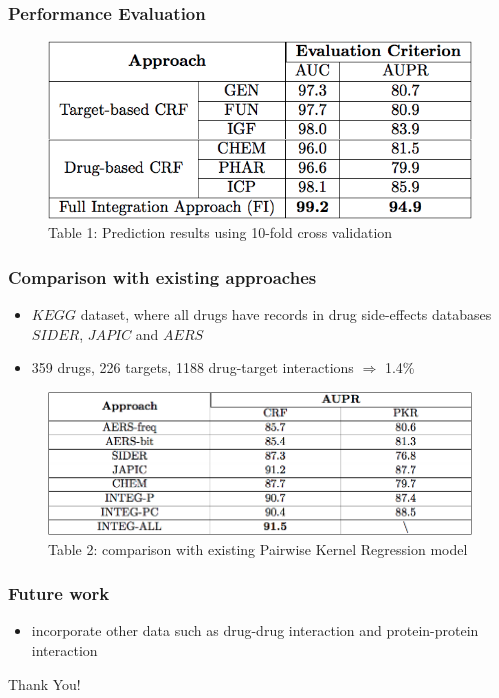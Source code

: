 \documentclass[11pt]{beamer}
\begin{document}
\begin{frame}
\frametitle{Performance Evaluation}
\begin{center}
\begin{figure}
\includegraphics[scale=0.4]{table1} 
\caption{Table 1: Prediction results using 10-fold cross validation}
\end{figure}
\end{center}
\end{frame}

\begin{frame}
\frametitle{Comparison with existing approaches}
\begin{itemize}
\item $KEGG$ dataset, where all drugs have records in drug side-effects databases $SIDER$, $JAPIC$ and $AERS$
\item 359 drugs, 226 targets, 1188 drug-target interactions $\Rightarrow$ 1.4\%
\end{itemize}

\begin{center}
\begin{figure}
\includegraphics[scale=0.3]{table2} 
\caption{Table 2: comparison with existing Pairwise Kernel Regression model}
\end{figure}
\end{center}
\end{frame}

\begin{frame}
\frametitle{Future work}
\begin{itemize}
\item incorporate other data such as drug-drug interaction and protein-protein interaction
\end{itemize}
\end{frame}

\begin{frame}
Thank You!
\end{frame}
\end{document}
